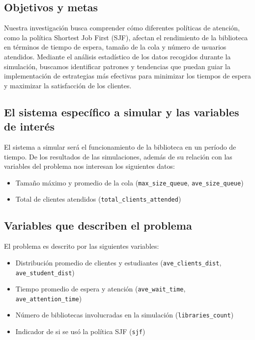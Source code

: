 \documentclass[10pt,twocolumn]{article}
\begin{document}
\subsection{Objetivos y metas}
Nuestra investigación busca comprender cómo diferentes políticas de atención, como la política Shortest Job First (SJF), afectan el rendimiento de la biblioteca en términos de tiempo de espera, tamaño de la cola y número de usuarios atendidos. Mediante el análisis estadístico de los datos recogidos durante la simulación, buscamos identificar patrones y tendencias que puedan guiar la implementación de estrategias más efectivas para minimizar los tiempos de espera y maximizar la satisfacción de los clientes.

\subsection{El sistema específico a simular y las variables de interés}
El sistema a simular será el funcionamiento de la biblioteca en un período de tiempo. De los resultados de las simulaciones, además de su relación con las variables del problema nos interesan los siguientes datos:
\begin{itemize}
	\item Tamaño máximo y promedio de la cola (\texttt{max\_size\_queue}, \texttt{ave\_size\_queue})
	\item Total de clientes atendidos (\texttt{total\_clients\_attended})
\end{itemize}

\subsection{Variables que describen el problema}
El problema es descrito por las siguientes variables:
\begin{itemize}
	\item Distribución promedio de clientes y estudiantes (\texttt{ave\_clients\_dist}, \texttt{ave\_student\_dist})
	\item Tiempo promedio de espera y atención (\texttt{ave\_wait\_time}, \texttt{ave\_attention\_time})
	\item Número de bibliotecas involucradas en la simulación (\texttt{libraries\_count})
	\item Indicador de si se usó la política SJF (\texttt{sjf})
\end{itemize}
\end{document}
